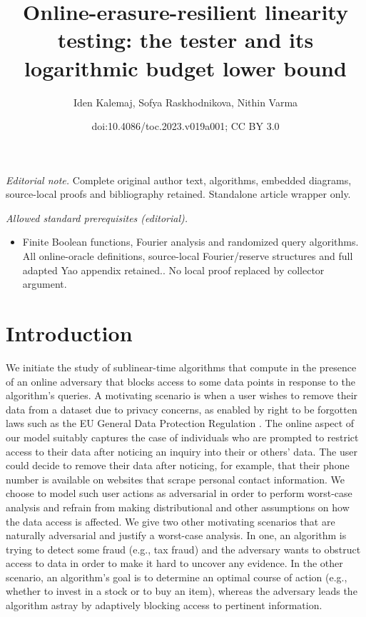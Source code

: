 \documentclass[11pt]{article}
\title{Online-erasure-resilient linearity testing: the tester and its logarithmic budget lower bound}
\author{Iden Kalemaj, Sofya Raskhodnikova, Nithin Varma}
\date{doi:10.4086/toc.2023.v019a001; CC BY 3.0}
\numberwithin{equation}{section}
\theoremstyle{definition}
\theoremstyle{plain}
\begin{document}
\maketitle
\noindent\textit{Editorial note.} Complete original author text, algorithms, embedded diagrams, source-local proofs and bibliography retained. Standalone article wrapper only.\par\medskip
\noindent\textit{Allowed standard prerequisites (editorial).}\begin{itemize}
\item Finite Boolean functions, Fourier analysis and randomized query algorithms. All online-oracle definitions, source-local Fourier/reserve structures and full adapted Yao appendix retained.. No local proof replaced by collector argument.
\end{itemize}\medskip
\section{Introduction}

	   
We initiate the study of sublinear-time algorithms that compute in the presence of an online adversary that blocks access to some data points in response to the algorithm's queries. A motivating scenario is when a user wishes to remove their data from a dataset due to privacy concerns, as enabled by right to be forgotten laws such as the EU General Data Protection Regulation \cite{Mantelero13}. 
The online aspect of our model suitably captures the case of individuals who are prompted to restrict access to their data after noticing an inquiry into their or others' data. The user could decide to remove their data after noticing, for example, that their phone number is available on websites that scrape personal contact information.
We choose to model such user actions as adversarial in order to perform worst-case analysis and refrain from making distributional and other assumptions on how the data access is affected. We give two other motivating scenarios that are naturally adversarial and justify a worst-case analysis. In one, an  algorithm is trying to detect some fraud (e.g., tax fraud) and the adversary wants to obstruct access to data in order to make it hard to uncover any evidence. In the other scenario, an algorithm's goal is to determine an optimal course of action (e.g., whether to invest in a stock or to buy an item), whereas the adversary leads the algorithm astray by adaptively blocking access to pertinent information. 
\end{document}
